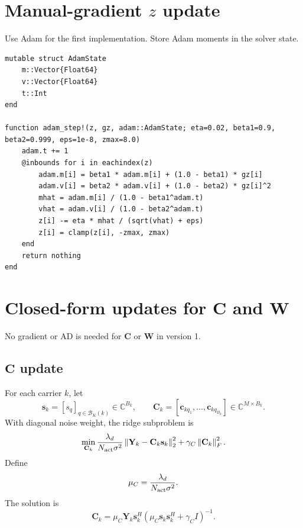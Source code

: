 \documentclass[11pt]{article}
\newcommand{\C}{\mathbb{C}}
\newcommand{\norm}[1]{\left\lVert #1 \right\rVert}
\begin{document}
\section{Manual-gradient $z$ update}

Use Adam for the first implementation.  Store Adam moments in the solver state.

\begin{lstlisting}
mutable struct AdamState
    m::Vector{Float64}
    v::Vector{Float64}
    t::Int
end

function adam_step!(z, gz, adam::AdamState; eta=0.02, beta1=0.9, beta2=0.999, eps=1e-8, zmax=8.0)
    adam.t += 1
    @inbounds for i in eachindex(z)
        adam.m[i] = beta1 * adam.m[i] + (1.0 - beta1) * gz[i]
        adam.v[i] = beta2 * adam.v[i] + (1.0 - beta2) * gz[i]^2
        mhat = adam.m[i] / (1.0 - beta1^adam.t)
        vhat = adam.v[i] / (1.0 - beta2^adam.t)
        z[i] -= eta * mhat / (sqrt(vhat) + eps)
        z[i] = clamp(z[i], -zmax, zmax)
    end
    return nothing
end
\end{lstlisting}

\section{Closed-form updates for $\mathbf C$ and $\mathbf W$}

No gradient or AD is needed for $\mathbf C$ or $\mathbf W$ in version 1.

\subsection{$\mathbf C$ update}

For each carrier $k$, let
\begin{equation}
\mathbf s_k=[s_q]_{q\in\mathcal B_K(k)}\in\C^{B_k},
\qquad
\mathbf C_k=[\mathbf c_{kq_1},\ldots,\mathbf c_{kq_{B_k}}]\in\C^{M\times B_k}.
\end{equation}
With diagonal noise weight, the ridge subproblem is
\begin{equation}
\min_{\mathbf C_k}
\frac{\lambda_d}{N_{\rm act}\sigma^2}
\norm{\mathbf Y_k-\mathbf C_k\mathbf s_k}_2^2
+\gamma_C\norm{\mathbf C_k}_F^2.
\end{equation}
Define
\begin{equation}
\mu_C=\frac{\lambda_d}{N_{\rm act}\sigma^2}.
\end{equation}
The solution is
\begin{equation}
\boxed{
\mathbf C_k
=\mu_C\mathbf Y_k\mathbf s_k^H
\left(\mu_C\mathbf s_k\mathbf s_k^H+\gamma_C I\right)^{-1}.}
\end{equation}
\end{document}
